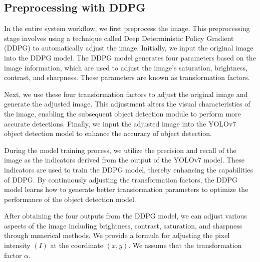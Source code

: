 \documentclass[PhD]{PHlab-thesis}
\begin{document}
\subsection{Preprocessing with DDPG}
In the entire system workflow, we first preprocess the image. This preprocessing stage involves using a technique called Deep Deterministic Policy Gradient (DDPG) to automatically adjust the image. Initially, we input the original image into the DDPG model. The DDPG model generates four parameters based on the image information, which are used to adjust the image's saturation, brightness, contrast, and sharpness. These parameters are known as transformation factors.

Next, we use these four transformation factors to adjust the original image and generate the adjusted image. This adjustment alters the visual characteristics of the image, enabling the subsequent object detection module to perform more accurate detections. Finally, we input the adjusted image into the YOLOv7 object detection model to enhance the accuracy of object detection.

During the model training process, we utilize the precision and recall of the image as the indicators derived from the output of the YOLOv7 model. These indicators are used to train the DDPG model, thereby enhancing the capabilities of DDPG. By continuously adjusting the transformation factors, the DDPG model learns how to generate better transformation parameters to optimize the performance of the object detection model.

After obtaining the four outputs from the DDPG model, we can adjust various aspects of the image including brightness, contrast, saturation, and sharpness through numerical methods. We provide a formula for adjusting the pixel intensity $(I)$ at the coordinate $(x,y)$. We assume that the transformation factor $\alpha$.
\end{document}

